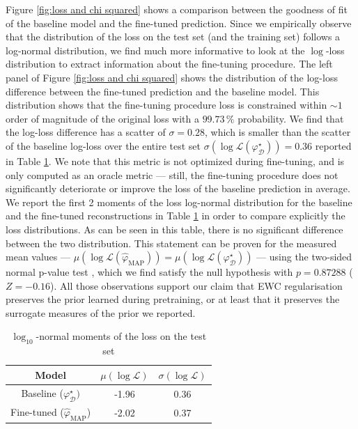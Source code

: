 Figure \ref{fig:loss and chi squared} shows a comparison between 
the goodness of fit of the baseline model and the fine-tuned prediction. 
Since we empirically observe that the distribution of the loss on the test set (and the training set) follows a log-normal distribution, we find much more informative to look at the $\log$-loss 
distribution to extract information about the fine-tuning procedure. 
The left panel of Figure \ref{fig:loss and chi squared} 
shows the distribution of the log-loss difference between the fine-tuned prediction and the baseline model. This distribution shows that the fine-tuning procedure loss is constrained within $\sim 1$ order of magnitude of the original loss with a $99.73\,\%$ probability. We find that the log-loss difference has a scatter of $\sigma = 0.28$, which is smaller than the scatter of the baseline log-loss over the entire test set $\sigma(\log \mathcal{L}(\varphi^\star_{\mathcal{D}})) = 0.36$ reported in Table \ref{tab:loss}.
We note that this metric is not optimized during fine-tuning, 
and is only computed as an oracle metric --- still, the fine-tuning procedure does not significantly deteriorate or improve the loss of the baseline prediction in average. We report the first 2 moments of the loss log-normal distribution for the baseline and the fine-tuned reconstructions in Table \ref{tab:loss} in order to compare explicitly the loss distributions. As can be seen in this table, there is no significant difference between the two distribution. This statement can be proven for the measured mean values --- $\mu(\log \mathcal{L}(\hat{\varphi}_{\mathrm{MAP}})) = \mu(\log \mathcal{L}(\varphi^{\star}_{\mathcal{D}})) $ --- using the two-sided normal p-value test \citep{Casella2001}, which we find satisfy the null hypothesis with $p=0.87288$ ($Z = -0.16$). All those observations support our claim that EWC regularisation preserves the prior learned during pretraining, or at least that it preserves the surrogate measures of the prior we reported. 


\begin{table}[th!]
    \centering
    \caption{$\log_{10}$-normal moments of the loss on the test set}
    \label{tab:loss}
    \begin{tabular}{ccc}
        \hline
          Model  & $\mu(\log \mathcal{L})$ & $\sigma(\log \mathcal{L})$ \\
        \hline \hline
        Baseline ($\varphi_{\mathcal{D}}^\star)$ &  -1.96 & 0.36 \\
        Fine-tuned ($\hat{\varphi}_{\mathrm{MAP}}$) & -2.02 & 0.37 \\\hline
    \end{tabular}

\end{table}

